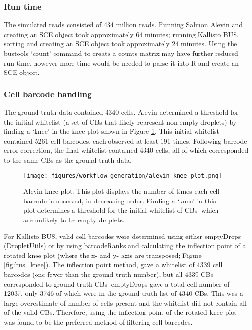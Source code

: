 \subsubsection{Run time}
The simulated reads consisted of 434 million reads.
Running Salmon Alevin and creating an SCE object took approximately 64 minutes;
running Kallisto BUS, sorting and creating an SCE object took approximately 24 minutes.
Using the bustools `count' command to create a counts matrix may have further reduced run time, however more time would be needed to parse it into R and create an SCE object.

\subsubsection{Cell barcode handling}
The ground-truth data contained 4340 cells.
Alevin determined a threshold for the initial whitelist (a set of CBs that likely represent non-empty droplets) by finding a `knee' in the knee plot shown in Figure \ref{fig:alevin_knee}.
This initial whitelist contained 5261 cell barcodes, each observed at least 191 times.
Following barcode error correction, the final whitelist contained 4340 cells, all of which corresponded to the same CBs as the ground-truth data.

\begin{figure}[htb]
    \centering
    \texttt{[image: figures/workflow\_generation/alevin\_knee\_plot.png]}
    \caption[Benchmark Salmon Alevin Knee Plot]{Alevin knee plot.
    This plot displays the number of times each cell barcode is observed, in decreasing order.
    Finding a `knee' in this plot determines a threshold for the initial whitelist of CBs, which are unlikely to be empty droplets.}
    \label{fig:alevin_knee}
\end{figure}

For Kallisto BUS, valid cell barcodes were determined using either emptyDrops (DropletUtils) or by
using barcodeRanks and calculating the inflection point of a rotated knee plot (where the x- and y- axis are transposed; Figure \ref{fig:bus_knee}).
The inflection point method, gave a whitelist of 4339 cell barcodes (one fewer than the ground truth number), but all 4339 CBs corresponded to ground truth CBs.
emptyDrops gave a total cell number of 12037, only 3746 of which were in the ground truth list of 4340 CBs. This was a large overestimate of number of cells present and the whitelist did not contain all of the valid CBs.
Therefore, using the inflection point of the rotated knee plot was found to be the preferred method of filtering cell barcodes.

